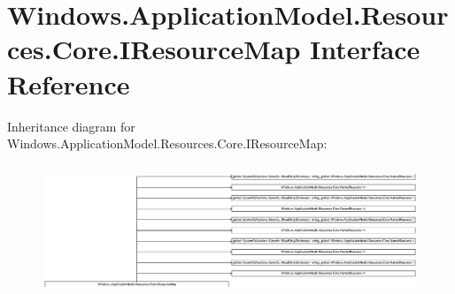 \hypertarget{interface_windows_1_1_application_model_1_1_resources_1_1_core_1_1_i_resource_map}{}\section{Windows.\+Application\+Model.\+Resources.\+Core.\+I\+Resource\+Map Interface Reference}
\label{interface_windows_1_1_application_model_1_1_resources_1_1_core_1_1_i_resource_map}
Inheritance diagram for Windows.\+Application\+Model.\+Resources.\+Core.\+I\+Resource\+Map\+:\begin{figure}[H]
\begin{center}
\leavevmode
\includegraphics[height=3.923567cm]{interface_windows_1_1_application_model_1_1_resources_1_1_core_1_1_i_resource_map}
\end{center}
\end{figure}
